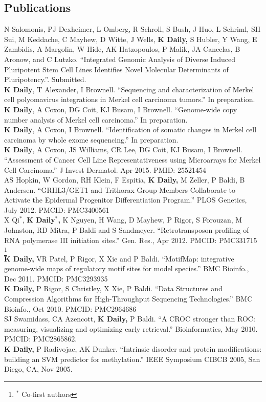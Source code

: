 \documentclass[margin,line]{res}
\begin{document}
\begin{resume}
\section{\sc Publications}
N Salomonis, PJ Dexheimer, L Omberg, R Schroll, S Bush, J Huo, L Schriml, SH Sui, M Keddache, C Mayhew, D Witte, J Wells, \textbf{K Daily,} S Hubler, Y Wang, E Zambidis, A Margolin, W Hide, AK Hatzopoulos, P Malik, JA Cancelas, B Aronow, and C Lutzko. ``Integrated Genomic Analysis of Diverse Induced Pluripotent Stem Cell Lines Identifies Novel Molecular Determinants of Pluripotency.''. Submitted. \\
\textbf{K Daily}, T Alexander, I Brownell. ``Sequencing and characterization of Merkel cell polyomavirus integrations in Merkel cell carcinoma tumors.'' In preparation.\\
\textbf{K Daily}, A Coxon, DG Coit, KJ Busam, I Brownell. ``Genome-wide copy number analysis of Merkel cell carcinoma.'' In preparation.\\
\textbf{K Daily}, A Coxon, I Brownell. ``Identification of somatic changes in Merkel cell carcinoma by whole exome sequencing.'' In preparation.\\
\textbf{K Daily}, A Coxon, JS Williams, CR Lee, DG Coit, KJ Busam, I
Brownell. ``Assessment of Cancer Cell Line Representativeness using
Microarrays for Merkel Cell Carcinoma.'' J Invest Dermatol. Apr 2015. PMID: 25521454\\
AS Hopkin, W Gordon, RH Klein, F Espitia, \textbf{K Daily,} M Zeller, P Baldi, B Andersen. ``GRHL3/GET1 and Trithorax Group Members Collaborate to Activate the Epidermal Progenitor Differentiation Program.'' PLOS Genetics, July 2012. PMCID: PMC3400561\\
X Qi$^*$, \textbf{K Daily$^*$,} K Nguyen, H Wang, D Mayhew, P Rigor, S Forouzan, M Johnston, RD Mitra, P Baldi and S Sandmeyer. ``Retrotransposon profiling of RNA polymerase III initiation sites.'' Gen. Res., Apr 2012. PMCID: PMC331715 \let\thefootnote\relax\footnote{$^*$ Co-first authors} \\
\textbf{K Daily,} VR Patel, P Rigor, X Xie and P Baldi. ``MotifMap: integrative genome-wide maps of regulatory motif sites for model species.'' BMC Bioinfo., Dec 2011. PMCID: PMC3293935\\
\textbf{K Daily,} P Rigor, S Christley, X Xie, P Baldi. ``Data Structures and Compression Algorithms for High-Throughput Sequencing Technologies.'' BMC Bioinfo., Oct 2010. PMCID: PMC2964686\\
SJ Swamidass, CA Azencott, \textbf{K Daily,} P Baldi. ``A CROC stronger than ROC: measuring, visualizing and optimizing early retrieval.'' Bioinformatics, May 2010. PMCID: PMC2865862.\\
\textbf{K Daily,} P Radivojac, AK Dunker. ``Intrinsic disorder and protein modifications: building an SVM predictor for methylation.'' IEEE Symposium CIBCB 2005, San Diego, CA, Nov 2005.


\end{resume}
\end{document}
